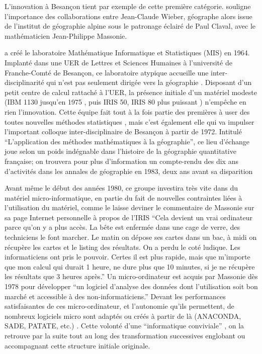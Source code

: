 L'innovation à Besançon tient par exemple de cette première catégorie. \textcite[131]{Cuyala2014} souligne l’importance des collaborations entre Jean-Claude Wieber, géographe alors issue de l’institut de géographie alpine sous le patronage éclairé de Paul Claval, avec le mathématicien Jean-Philippe Massonie.

\textcite{Massonie1986} a créé le laboratoire Mathématique Informatique et Statistiques (MIS) en 1964. Implanté dans une UER de Lettres et Sciences Humaines à l’université de Franche-Comté de Besançon, ce laboratoire atypique accueille une inter-disciplinarité qui n'est pas seulement dirigée vers la géographie . Disposant d’un petit centre de calcul rattaché à l'UER, la présence initiale d'un matériel modeste (IBM 1130 jusqu'en 1975 \autocite[22]{Wieber1980}, puis IRIS 50, IRIS 80 plus puissant \autocite{Massonie1986}) n'empêche en rien l'innovation. Cette équipe fait tout à la fois partie des premières à user des toutes nouvelles méthodes statistiques \autocite{Massonie1971}, mais c'est également elle qui va impulser l'important colloque inter-disciplinaire de Besançon à partir de 1972. Intitulé \enquote{L'application des méthodes mathématiques à la géographie}, ce lieu d'échange joue selon \autocite[331]{Cuyala2014} un poids indégnable dans l'histoire de la géographie quantitative française; on trouvera pour plus d'information un compte-rendu des dix ans d'activités dans les annales de géographie en 1983, deux ans avant sa disparition \autocite{Massonie1983}

Avant même le début des années 1980, ce groupe investira très vite dans du matériel micro-informatique, en partie du fait de nouvelles contraintes liées à l'utilisation du matériel, comme le laisse deviner le commentaire de Massonie sur sa page Internet personnelle à propos de l'IRIS \enquote{Cela devient un vrai ordinateur parce qu'on y a plus accès. La bête est enfermée dans une cage de verre, des techniciens le font marcher. Le matin on dépose ses cartes dans un bac, à midi on récupère les cartes et le listing des résultats. On a perdu le coté ludique. Les informaticiens ont pris le pouvoir. Certes il est plus rapide, mais que m'importe que mon calcul qui durait 1 heure, ne dure plus que 10 minutes, si je ne récupère les résultats que 3 heures après.} Un micro-ordinateur est acquis par Massonie dès 1978 pour développer \enquote{un logiciel d'analyse des données dont l'utilisation soit bon marché et accessible à des non-informaticiens.} Devant les performances satisfaisantes de ces micro-ordinateur, et l'autonomie qu'ils permettent, de nombreux logiciels micro sont adaptés ou créés à partir de là (ANACONDA, SADE, PATATE, etc.) \autocite{Massonie1986}. Cette volonté d'une \enquote{informatique conviviale} \autocite{TSH1984}, on la retrouve par la suite tout au long des transformation successives englobant ou accompagnant cette structure initiale originale.

